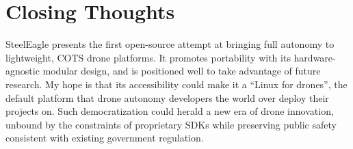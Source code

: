 \section{Closing Thoughts}
SteelEagle presents the first open-source attempt at bringing full autonomy to lightweight, COTS drone platforms. It promotes portability with its hardware-agnostic modular design, and is positioned well to take advantage of future research. My hope is that its accessibility could make it a ``Linux for drones'', the default platform that drone autonomy developers the world over deploy their projects on. Such democratization could herald a new era of drone innovation, unbound by the constraints of proprietary SDKs while preserving public safety consistent with existing government regulation.





